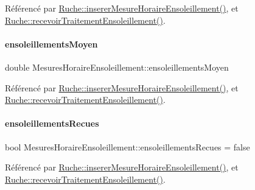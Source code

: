 Référencé par \hyperlink{class_ruche_a658234b9d96541d204b95b74556742b6}{Ruche\+::inserer\+Mesure\+Horaire\+Ensoleillement()}, et \hyperlink{class_ruche_a2ac5766ce8652084f034c498691488ea}{Ruche\+::recevoir\+Traitement\+Ensoleillement()}.

\mbox{\label{struct_mesures_horaire_ensoleillement_a41c11dd16f5e42cf8b4882f98b9cee49}} 
\paragraph{\texorpdfstring{ensoleillements\+Moyen}{ensoleillementsMoyen}}
{\footnotesize\ttfamily double Mesures\+Horaire\+Ensoleillement\+::ensoleillements\+Moyen}



Référencé par \hyperlink{class_ruche_a658234b9d96541d204b95b74556742b6}{Ruche\+::inserer\+Mesure\+Horaire\+Ensoleillement()}, et \hyperlink{class_ruche_a2ac5766ce8652084f034c498691488ea}{Ruche\+::recevoir\+Traitement\+Ensoleillement()}.

\mbox{\label{struct_mesures_horaire_ensoleillement_a78d40966edb1ace93776ba33edfc5151}} 
\paragraph{\texorpdfstring{ensoleillements\+Recues}{ensoleillementsRecues}}
{\footnotesize\ttfamily bool Mesures\+Horaire\+Ensoleillement\+::ensoleillements\+Recues = false}



Référencé par \hyperlink{class_ruche_a658234b9d96541d204b95b74556742b6}{Ruche\+::inserer\+Mesure\+Horaire\+Ensoleillement()}, et \hyperlink{class_ruche_a2ac5766ce8652084f034c498691488ea}{Ruche\+::recevoir\+Traitement\+Ensoleillement()}.

\mbox{\label{struct_mesures_horaire_ensoleillement_a478cf936fa746f384445cf5077206454}} 
